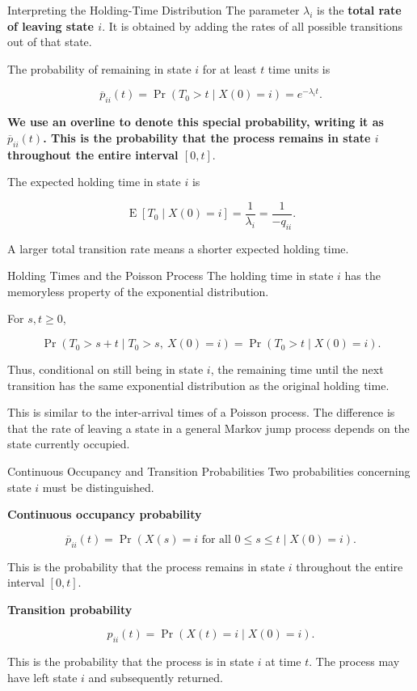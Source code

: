 \documentclass[
  ignorenonframetext,
  aspectratio=169,
]{beamer}
\begin{document}
\begin{frame}{Interpreting the Holding-Time Distribution}
\protect{}\label{interpreting-the-holding-time-distribution}
The parameter \(\lambda_i\) is the \textbf{total rate of leaving state
\(i\)}. It is obtained by adding the rates of all possible transitions
out of that state.

The probability of remaining in state \(i\) for at least \(t\) time
units is

\[
\boxed{
\overline p_{ii}(t)
=\Pr(T_0>t\mid X(0)=i)
=e^{-\lambda_i t}.
}
\]

\textbf{We use an overline to denote this special probability, writing
it as \(\overline{p}_{ii}(t)\). This is the probability that the process
remains in state \(i\) throughout the entire interval \([0,t]\)}.

The expected holding time in state \(i\) is

\[
\boxed{
\operatorname{E}[T_0\mid X(0)=i]
=\frac{1}{\lambda_i}
=\frac{1}{-q_{ii}}.
}
\]

A larger total transition rate means a shorter expected holding time.
\end{frame}

\begin{frame}{Holding Times and the Poisson Process}
\protect{}\label{holding-times-and-the-poisson-process}
The holding time in state \(i\) has the memoryless property of the
exponential distribution.

For \(s,t\geq 0\),

\[
\Pr(T_0>s+t\mid T_0>s,\ X(0)=i)
=
\Pr(T_0>t\mid X(0)=i).
\]

Thus, conditional on still being in state \(i\), the remaining time
until the next transition has the same exponential distribution as the
original holding time.

This is similar to the inter-arrival times of a Poisson process. The
difference is that the rate of leaving a state in a general Markov jump
process depends on the state currently occupied.
\end{frame}

\begin{frame}{Continuous Occupancy and Transition Probabilities}
\protect{}\label{continuous-occupancy-and-transition-probabilities}
Two probabilities concerning state \(i\) must be distinguished.

\textbf{Continuous occupancy probability}

\[
\overline p_{ii}(t)
=
\Pr(X(s)=i\text{ for all }0\leq s\leq t\mid X(0)=i).
\]

This is the probability that the process remains in state \(i\)
throughout the entire interval \([0,t]\).

\textbf{Transition probability}

\[
p_{ii}(t)
=
\Pr(X(t)=i\mid X(0)=i).
\]

This is the probability that the process is in state \(i\) at time
\(t\). The process may have left state \(i\) and subsequently returned.
\end{frame}
\end{document}
